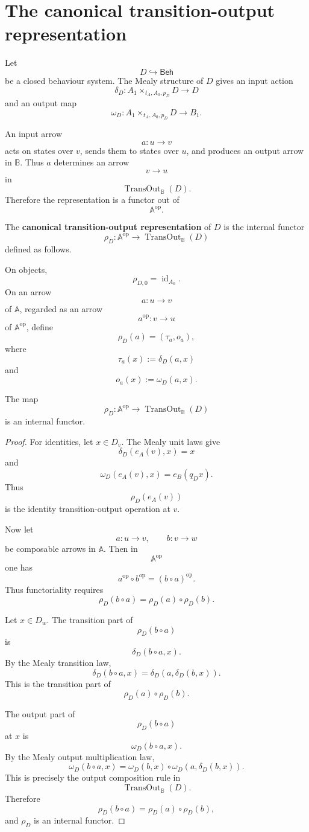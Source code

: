\section{The canonical transition-output representation}
\label{sec:eilenberg-canonical-transition-output-representation}

Let
\[
D\hookrightarrow\mathsf{Beh}
\]
be a closed behaviour system. The Mealy structure of \(D\) gives an input
action
\[
\delta_D:
A_1\times_{t_A,A_0,p_D}D\to D
\]
and an output map
\[
\omega_D:
A_1\times_{t_A,A_0,p_D}D\to B_1.
\]

An input arrow
\[
a:u\to v
\]
acts on states over \(v\), sends them to states over \(u\), and produces an
output arrow in \(\mathbb B\). Thus \(a\) determines an arrow
\[
v\to u
\]
in
\[
\operatorname{TransOut}_{\mathbb B}(D).
\]
Therefore the representation is a functor out of
\[
\mathbb A^{\mathrm{op}}.
\]

\begin{definition}
\label{def:eilenberg-rho-D}
The \textbf{canonical transition-output representation} of \(D\) is the
internal functor
\[
\rho_D:
\mathbb A^{\mathrm{op}}
\to
\operatorname{TransOut}_{\mathbb B}(D)
\]
defined as follows.

On objects,
\[
\rho_{D,0}=\operatorname{id}_{A_0}.
\]
On an arrow
\[
a:u\to v
\]
of \(\mathbb A\), regarded as an arrow
\[
a^{\mathrm{op}}:v\to u
\]
of \(\mathbb A^{\mathrm{op}}\), define
\[
\rho_D(a)=(\tau_a,o_a),
\]
where
\[
\tau_a(x):=\delta_D(a,x)
\]
and
\[
o_a(x):=\omega_D(a,x).
\]
\end{definition}

\begin{proposition}
\label{prop:eilenberg-rho-D-functor}
The map
\[
\rho_D:
\mathbb A^{\mathrm{op}}
\to
\operatorname{TransOut}_{\mathbb B}(D)
\]
is an internal functor.
\end{proposition}

\begin{proof}
For identities, let \(x\in D_v\). The Mealy unit laws give
\[
\delta_D(e_A(v),x)=x
\]
and
\[
\omega_D(e_A(v),x)=e_B(q_Dx).
\]
Thus
\[
\rho_D(e_A(v))
\]
is the identity transition-output operation at \(v\).

Now let
\[
a:u\to v,
\qquad
b:v\to w
\]
be composable arrows in \(\mathbb A\). Then in
\[
\mathbb A^{\mathrm{op}}
\]
one has
\[
a^{\mathrm{op}}\circ b^{\mathrm{op}}=(b\circ a)^{\mathrm{op}}.
\]
Thus functoriality requires
\[
\rho_D(b\circ a)=\rho_D(a)\circ\rho_D(b).
\]

Let \(x\in D_w\). The transition part of
\[
\rho_D(b\circ a)
\]
is
\[
\delta_D(b\circ a,x).
\]
By the Mealy transition law,
\[
\delta_D(b\circ a,x)
=
\delta_D(a,\delta_D(b,x)).
\]
This is the transition part of
\[
\rho_D(a)\circ\rho_D(b).
\]

The output part of
\[
\rho_D(b\circ a)
\]
at \(x\) is
\[
\omega_D(b\circ a,x).
\]
By the Mealy output multiplication law,
\[
\omega_D(b\circ a,x)
=
\omega_D(b,x)\circ
\omega_D(a,\delta_D(b,x)).
\]
This is precisely the output composition rule in
\[
\operatorname{TransOut}_{\mathbb B}(D).
\]
Therefore
\[
\rho_D(b\circ a)=\rho_D(a)\circ\rho_D(b),
\]
and \(\rho_D\) is an internal functor.
\end{proof}

